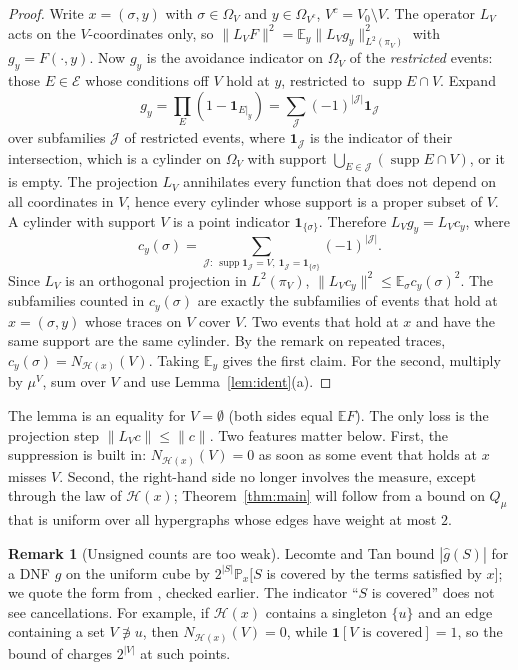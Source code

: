 \documentclass[11pt,reqno]{amsart}
\theoremstyle{definition}
\newtheorem{remark}[theorem]{Remark}
\newcommand{\E}{\mathbb E}
\newcommand{\PP}{\mathbb P}
\newcommand{\supp}{\operatorname{supp}}
\newcommand{\Ho}{\mathcal H}
\newcommand{\cE}{\mathcal E}
\newcommand{\cJ}{\mathcal J}
\begin{document}
\begin{proof}
Write $x=(\sigma,y)$ with $\sigma\in\Omega_V$ and $y\in\Omega_{V^c}$, $V^c=V_0\setminus V$.  The
operator $L_V$ acts on the $V$-coordinates only, so
$\|L_VF\|^2=\E_y\|L_Vg_y\|^2_{L^2(\pi_V)}$ with $g_y=F(\cdot,y)$.  Now $g_y$ is the
avoidance indicator on $\Omega_V$ of the \emph{restricted} events: those $E\in\cE$
whose conditions off $V$ hold at $y$, restricted to $\supp E\cap V$.  Expand
\[
 g_y=\prod_E(1-\mathbf 1_{E|_y})=\sum_{\cJ}(-1)^{|\cJ|}\mathbf 1_\cJ
\]
over subfamilies $\cJ$ of restricted events, where $\mathbf 1_\cJ$ is the indicator
of their intersection, which is a cylinder on $\Omega_V$ with
support $\bigcup_{E\in\cJ}(\supp E\cap V)$, or it is empty.  The projection $L_V$ annihilates every
function that does not depend on all coordinates in $V$, hence every
cylinder whose support is a proper subset of $V$.  A cylinder with support
$V$ is a point indicator $\mathbf 1_{\{\sigma\}}$.  Therefore $L_Vg_y=L_Vc_y$, where
\[
 c_y(\sigma)=\sum_{\cJ:\ \supp\mathbf 1_\cJ=V,\ \mathbf 1_\cJ=\mathbf 1_{\{\sigma\}}}(-1)^{|\cJ|}.
\]
Since $L_V$ is an orthogonal projection in $L^2(\pi_V)$,
$\|L_Vc_y\|^2\le\E_\sigma c_y(\sigma)^2$.  The subfamilies counted in $c_y(\sigma)$ are
exactly the subfamilies of events that hold at $x=(\sigma,y)$ whose traces on
$V$ cover $V$.  Two events that hold at $x$ and have the same support are the
same cylinder.  By the remark on repeated traces, $c_y(\sigma)=N_{\Ho(x)}(V)$.
Taking $\E_y$ gives the first claim.  For the second, multiply by $\mu^V$, sum
over $V$ and use Lemma~\ref{lem:ident}(a).
\end{proof}

The lemma is an equality for $V=\emptyset$ (both sides equal $\E F$).  The only
loss is the projection step $\|L_Vc\|\le\|c\|$.  Two features matter below.
First, the suppression is built in: $N_{\Ho(x)}(V)=0$ as soon as some event
that holds at $x$ misses $V$.  Second, the right-hand side no longer involves
the measure, except through the law of $\Ho(x)$; Theorem~\ref{thm:main} will
follow from a bound on $Q_\mu$ that is uniform over all hypergraphs whose edges
have weight at most $2$.

\begin{remark}[Unsigned counts are too weak]\label{rem:unsigned}
Lecomte and Tan \cite[Fact~9]{LT} bound $|\hat g(S)|$ for a DNF $g$ on the uniform
cube by $2^{|S|}\PP_x[S$ is covered by the terms satisfied by $x]$; we quote
the form from \cite{LT}, checked earlier.  The indicator ``$S$ is covered'' does
not see cancellations.  For example, if $\Ho(x)$ contains a singleton $\{u\}$
and an edge containing a set $V\not\ni u$, then $N_{\Ho(x)}(V)=0$, while
$\mathbf 1[V\text{ is covered}]=1$, so the bound of \cite{LT} charges $2^{|V|}$ at such
points.
\end{remark}
\end{document}
